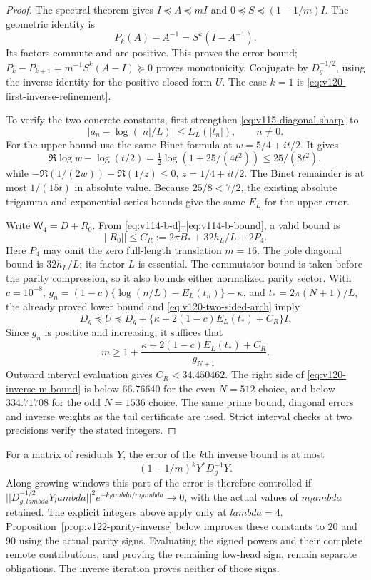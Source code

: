\documentclass[11pt]{article}
\def\lambda{lambda}%
\def\norm#1{||#1||}%
\theoremstyle{remark}
\newcommand{\norm}[1]{\left\lVert #1\right\rVert}
\begin{document}
\begin{proof}
The spectral theorem gives $I\preceq A\preceq mI$ and
$0\preceq S\preceq(1-1/m)I$. The geometric identity is
\[
 P_k(A)-A^{-1}=S^k(I-A^{-1}).
\]
Its factors commute and are positive. This proves the error bound;
$P_k-P_{k+1}=m^{-1}S^k(A-I)\succeq0$ proves monotonicity.
Conjugate by $D_g^{-1/2}$, using the inverse identity for the
positive closed form $U$. The case $k=1$ is
\eqref{eq:v120-first-inverse-refinement}.

To verify the two concrete constants, first strengthen
\eqref{eq:v115-diagonal-sharp} to
\begin{equation}\label{eq:v120-two-sided-arch}
 |a_n-\log(|n|/L)|\le E_L(|t_n|),\qquad n\ne0.
\end{equation}
For the upper bound use the same Binet formula at
$w=5/4+it/2$. It gives
\[
 \Re\log w-\log(t/2)
 =\tfrac12\log(1+25/(4t^2))\le25/(8t^2),
\]
while $-\Re(1/(2w))-\Re(1/z)\le0$, $z=1/4+it/2$.
The Binet remainder is at most $1/(15t)$ in absolute value.
Because $25/8<7/2$, the existing absolute trigamma and exponential
series bounds give the same $E_L$ for the upper error.

Write $\mathsf W_4=D+R_0$. From
\eqref{eq:v114-b-d}--\eqref{eq:v114-b-bound}, a valid bound is
\[
 \norm{R_0}\le C_R:=2\pi B_*+32h_L/L+2P_4.
\]
Here $P_4$ may omit the zero full-length translation $m=16$.
The pole diagonal bound is $32h_L/L$; its factor $L$ is essential.
The commutator bound is taken before the parity compression, so it
also bounds either normalized parity sector. With $c=10^{-8}$,
$g_n=(1-c)\{\log(n/L)-E_L(t_n)\}-\kappa$, and
$t_*=2\pi(N+1)/L$, the already proved lower bound and
\eqref{eq:v120-two-sided-arch} imply
\[
 D_g\preceq U\preceq
 D_g+\{\kappa+2(1-c)E_L(t_*)+C_R\}I.
\]
Since $g_n$ is positive and increasing, it suffices that
\begin{equation}\label{eq:v120-inverse-m-bound}
 m\ge1+\frac{\kappa+2(1-c)E_L(t_*)+C_R}{g_{N+1}}.
\end{equation}
Outward interval evaluation gives $C_R<34.450462$. The right side
of \eqref{eq:v120-inverse-m-bound} is below $66.76640$ for the
even $N=512$ choice, and below $334.71708$ for the odd $N=1536$
choice. The same prime bound, diagonal errors and inverse weights
as the tail certificate are used. Strict interval checks at two
precisions verify the stated integers.
\end{proof}

For a matrix of residuals $Y$, the error of the $k$th inverse bound
is at most
\[
 (1-1/m)^k Y^*D_g^{-1}Y.
\]
Along growing windows this part of the error is therefore controlled
if $\norm{D_{g,\lambda}^{-1/2}Y_\lambda}^2
 e^{-k_\lambda/m_\lambda}\to0$, with the actual values of
$m_\lambda$ retained. The explicit integers above apply only at
$\lambda=4$. Proposition~\ref{prop:v122-parity-inverse} below improves these
constants to $20$ and $90$ using the actual parity signs. Evaluating
the signed powers and their complete remote contributions, and
proving the remaining low-head sign, remain separate obligations. The inverse iteration proves neither of those signs.
\end{document}
